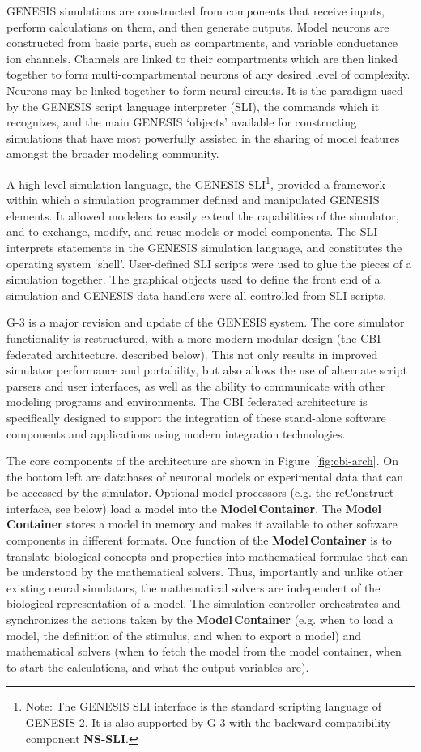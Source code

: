 \documentclass[12pt]{article}
\begin{document}
GENESIS simulations are constructed from components that receive inputs,
perform calculations on them, and then generate outputs. Model neurons
are constructed from basic parts, such as compartments, and
variable conductance ion channels. Channels are linked to their
compartments  which are then linked together to form multi-compartmental
neurons of any desired level of complexity. Neurons may be linked
together to form neural circuits.  It is the paradigm used by the
GENESIS script language interpreter (SLI), the commands which it recognizes, and the main GENESIS
`objects' available for constructing simulations that have
most powerfully assisted in the sharing of model features amongst the
broader modeling community.

A high-level simulation language, the GENESIS SLI\footnote{Note:
  The GENESIS SLI interface is the standard scripting language of
  GENESIS 2. It is also supported by G-3 with the backward compatibility component {\bf NS-SLI}.}, provided a
framework within which a simulation programmer defined and
manipulated GENESIS elements. It allowed modelers to easily extend the
capabilities of the simulator, and to exchange, modify, and reuse
models or model components. The SLI interprets statements in the
GENESIS simulation language, and constitutes the operating system
`shell'. User-defined SLI scripts were used to glue the pieces of a
simulation together. The graphical objects used to define the front
end of a simulation and GENESIS data handlers were all controlled from
SLI scripts.

G-3 is a major revision and update of the GENESIS system.  The core
simulator functionality is restructured, with a more modern modular
design (the CBI federated architecture, described below). This not
only results in improved simulator performance and portability, but
also allows the use of alternate script parsers and user interfaces,
as well as the ability to communicate with other modeling programs and
environments. The CBI federated architecture is specifically designed
to support the integration of these stand-alone software components
and applications using modern integration technologies.

The core components of the architecture are shown in
Figure~\ref{fig:cbi-arch}. On the bottom left are databases of
neuronal models or experimental data that can be accessed by the
simulator. Optional model processors (e.g. the reConstruct interface,
see below) load a model into the {\bf Model\,Container}.  The {\bf Model\,Container}
stores a model in memory and makes it available to other software
components in different formats.  One function of the {\bf Model\,Container}
is to translate biological concepts and properties into mathematical
formulae that can be understood by the mathematical solvers. Thus,
importantly and unlike other existing neural simulators, the
mathematical solvers are independent of the biological representation
of a model. The simulation controller orchestrates and synchronizes
the actions taken by the {\bf Model\,Container} (e.g. when to load a model,
the definition of the stimulus, and when to export a model) and
mathematical solvers (when to fetch the model from the model
container, when to start the calculations, and what the output
variables are).
\end{document}
